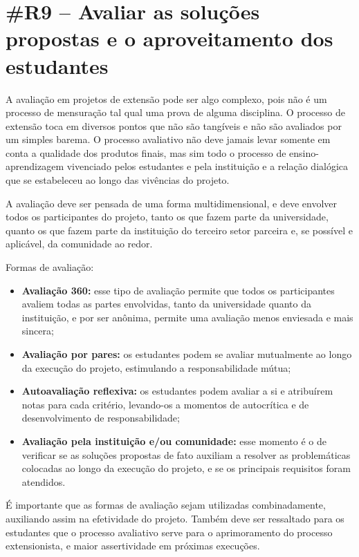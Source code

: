 \section*{\#R9 – Avaliar as soluções propostas e o aproveitamento dos estudantes}

A avaliação em projetos de extensão pode ser algo complexo, pois não é um processo de mensuração tal qual uma prova de alguma disciplina. O processo de extensão toca em diversos pontos que não são tangíveis e não são avaliados por um simples barema. O processo avaliativo não deve jamais levar somente em conta a qualidade dos produtos finais, mas sim todo o processo de ensino-aprendizagem vivenciado pelos estudantes e pela instituição e a relação dialógica que se estabeleceu ao longo das vivências do projeto.

A avaliação deve ser pensada de uma forma multidimensional, e deve envolver todos os participantes do projeto, tanto os que fazem parte da universidade, quanto os que fazem parte da instituição do terceiro setor parceira e, se possível e aplicável, da comunidade ao redor.

Formas de avaliação:

\begin{itemize}
    \item \textbf{Avaliação 360:} esse tipo de avaliação permite que todos os participantes avaliem todas as partes envolvidas, tanto da universidade quanto da instituição, e por ser anônima, permite uma avaliação menos enviesada e mais sincera;
    \item \textbf{Avaliação por pares:} os estudantes podem se avaliar mutualmente ao longo da execução do projeto, estimulando a responsabilidade mútua;
    \item \textbf{Autoavaliação reflexiva:} os estudantes podem avaliar a si e atribuírem notas para cada critério, levando-os a momentos de autocrítica e de desenvolvimento de responsabilidade;
    \item \textbf{Avaliação pela instituição e/ou comunidade:} esse momento é o de verificar se as soluções propostas de fato auxiliam a resolver as problemáticas colocadas ao longo da execução do projeto, e se os principais requisitos foram atendidos.
\end{itemize}

É importante que as formas de avaliação sejam utilizadas combinadamente, auxiliando assim na efetividade do projeto. Também deve ser ressaltado para os estudantes que o processo avaliativo serve para o aprimoramento do processo extensionista, e maior assertividade em próximas execuções.